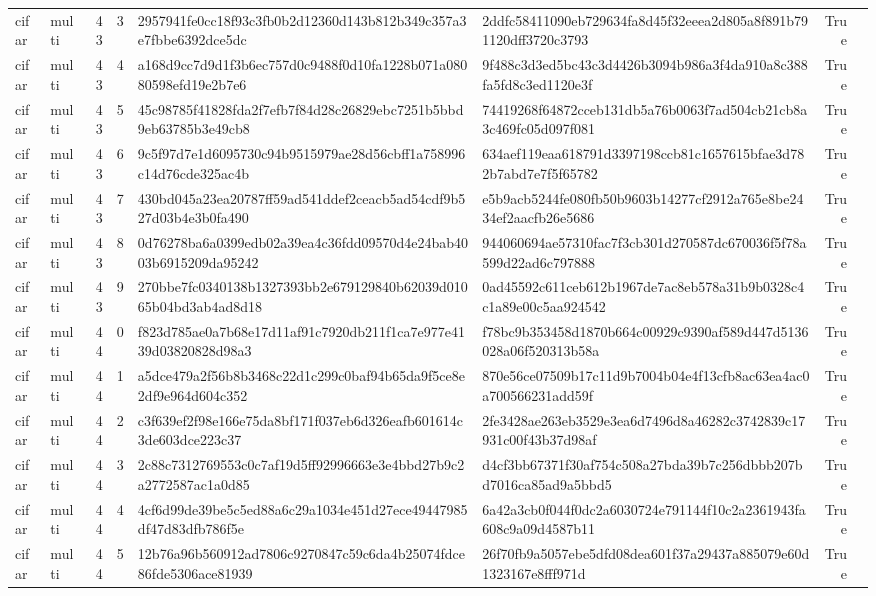 \begin{tabular}{llrrllrl}
cifar & multi & 43 & 3 & 2957941fe0cc18f93c3fb0b2d12360d143b812b349c357a3e7fbbe6392dce5dc & 2ddfc58411090eb729634fa8d45f32eeea2d805a8f891b791120dff3720c3793 & True &  \\
cifar & multi & 43 & 4 & a168d9cc7d9d1f3b6ec757d0c9488f0d10fa1228b071a08080598efd19e2b7e6 & 9f488c3d3ed5bc43c3d4426b3094b986a3f4da910a8c388fa5fd8c3ed1120e3f & True &  \\
cifar & multi & 43 & 5 & 45c98785f41828fda2f7efb7f84d28c26829ebc7251b5bbd9eb63785b3e49cb8 & 74419268f64872cceb131db5a76b0063f7ad504cb21cb8a3c469fc05d097f081 & True &  \\
cifar & multi & 43 & 6 & 9c5f97d7e1d6095730c94b9515979ae28d56cbff1a758996c14d76cde325ac4b & 634aef119eaa618791d3397198ccb81c1657615bfae3d782b7abd7e7f5f65782 & True &  \\
cifar & multi & 43 & 7 & 430bd045a23ea20787ff59ad541ddef2ceacb5ad54cdf9b527d03b4e3b0fa490 & e5b9acb5244fe080fb50b9603b14277cf2912a765e8be2434ef2aacfb26e5686 & True &  \\
cifar & multi & 43 & 8 & 0d76278ba6a0399edb02a39ea4c36fdd09570d4e24bab4003b6915209da95242 & 944060694ae57310fac7f3cb301d270587dc670036f5f78a599d22ad6c797888 & True &  \\
cifar & multi & 43 & 9 & 270bbe7fc0340138b1327393bb2e679129840b62039d01065b04bd3ab4ad8d18 & 0ad45592c611ceb612b1967de7ac8eb578a31b9b0328c4c1a89e00c5aa924542 & True &  \\
cifar & multi & 44 & 0 & f823d785ae0a7b68e17d11af91c7920db211f1ca7e977e4139d03820828d98a3 & f78bc9b353458d1870b664c00929c9390af589d447d5136028a06f520313b58a & True &  \\
cifar & multi & 44 & 1 & a5dce479a2f56b8b3468c22d1c299c0baf94b65da9f5ce8e2df9e964d604c352 & 870e56ce07509b17c11d9b7004b04e4f13cfb8ac63ea4ac0a700566231add59f & True &  \\
cifar & multi & 44 & 2 & c3f639ef2f98e166e75da8bf171f037eb6d326eafb601614c3de603dce223c37 & 2fe3428ae263eb3529e3ea6d7496d8a46282c3742839c17931c00f43b37d98af & True &  \\
cifar & multi & 44 & 3 & 2c88c7312769553c0c7af19d5ff92996663e3e4bbd27b9c2a2772587ac1a0d85 & d4cf3bb67371f30af754c508a27bda39b7c256dbbb207bd7016ca85ad9a5bbd5 & True &  \\
cifar & multi & 44 & 4 & 4cf6d99de39be5c5ed88a6c29a1034e451d27ece49447985df47d83dfb786f5e & 6a42a3cb0f044f0dc2a6030724e791144f10c2a2361943fa608c9a09d4587b11 & True &  \\
cifar & multi & 44 & 5 & 12b76a96b560912ad7806c9270847c59c6da4b25074fdce86fde5306ace81939 & 26f70fb9a5057ebe5dfd08dea601f37a29437a885079e60d1323167e8fff971d & True &  \\

\end{tabular}
